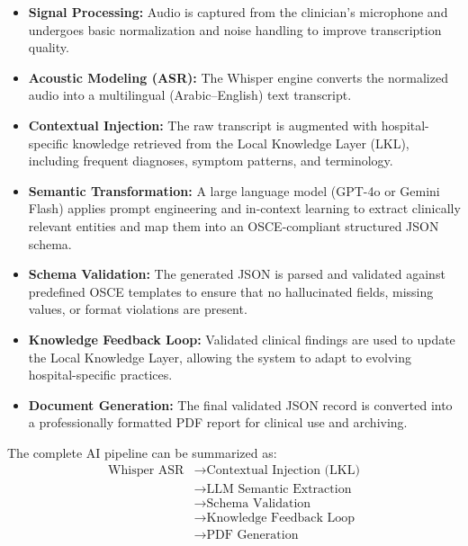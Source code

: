 \begin{itemize}
    \item \textbf{Signal Processing:} Audio is captured from the clinician’s microphone and undergoes basic normalization and noise handling to improve transcription quality.
    
    \item \textbf{Acoustic Modeling (ASR):} The Whisper engine converts the normalized audio into a multilingual (Arabic–English) text transcript.
    
    \item \textbf{Contextual Injection:} The raw transcript is augmented with hospital-specific knowledge retrieved from the Local Knowledge Layer (LKL), including frequent diagnoses, symptom patterns, and terminology.
    
    \item \textbf{Semantic Transformation:} A large language model (GPT-4o or Gemini Flash) applies prompt engineering and in-context learning to extract clinically relevant entities and map them into an OSCE-compliant structured JSON schema.
    
    \item \textbf{Schema Validation:} The generated JSON is parsed and validated against predefined OSCE templates to ensure that no hallucinated fields, missing values, or format violations are present.
    
    \item \textbf{Knowledge Feedback Loop:} Validated clinical findings are used to update the Local Knowledge Layer, allowing the system to adapt to evolving hospital-specific practices.
    
    \item \textbf{Document Generation:} The final validated JSON record is converted into a professionally formatted PDF report for clinical use and archiving.
\end{itemize}

The complete AI pipeline can be summarized as:
\[
\begin{aligned}
\text{Whisper ASR} 
&\rightarrow \text{Contextual Injection (LKL)} \\
&\rightarrow \text{LLM Semantic Extraction} \\
&\rightarrow \text{Schema Validation} \\
&\rightarrow \text{Knowledge Feedback Loop} \\
&\rightarrow \text{PDF Generation}
\end{aligned}
\]

